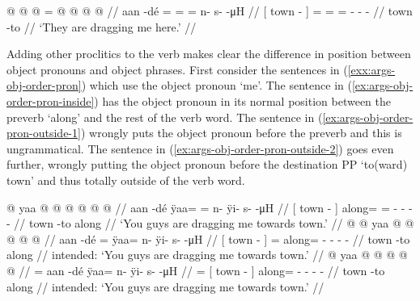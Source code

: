\ex\label{ex:args-obj-preceding}%
\begingl
	\gla	{}  @ {} {}  @  @ = @  @ {} @ {} @ {} //
	\glb	{} aan -dé {} = = = n- s-  -μH //
	\glc	{}[ town - {}] = = = - -
			 -  //
	\gld	{} town -to {}     {} {} {} //
	\glft	‘They are dragging me here.’
		//
\endgl
\xe

Adding other proclitics to the verb makes clear the difference in position between object pronouns and object phrases. First consider the sentences in (\ref{exx:args-obj-order-pron}) which use the object pronoun  ‘me’. The sentence in (\ref{ex:args-obj-order-pron-inside}) has the object pronoun in its normal position between the preverb  ‘along’ and the rest of the verb word. The sentence in (\ref{ex:args-obj-order-pron-outside-1}) wrongly puts the object pronoun before the preverb and this is ungrammatical. The sentence in (\ref{ex:args-obj-order-pron-outside-2}) goes even further, wrongly putting the object pronoun before the destination PP  ‘to(ward) town’ and thus totally outside of the verb word.

\pex\label{exx:args-obj-order-pron}%
\a\label{ex:args-obj-order-pron-inside}%
%
\begingl
	\gla	{}  @ {} {} yaa @  @  @ {} @ {} @ {} @ {} //
	\glb	{} aan -dé {} ÿaa= = n- ÿi- s-  -μH //
	\glc	{}[ town - {}] along= = - - - 
			 - //
	\gld	{} town -to {} along   {} {} {} {} {} //
	\glft	‘You guys are dragging me towards town.’
		//
\endgl
\a\label{ex:args-obj-order-pron-outside-1}%
\ljudge{*}%
%
\begingl
	\gla	{}  @ {} {}  @ yaa @  @ {} @ {} @ {} @ {} //
	\glb	{} aan -dé {} = ÿaa= n- ÿi- s-  -μH //
	\glc	{}[ town - {}] = along= - - - 
			 - //
	\gld	{} town -to {}  along  {} {} {} {} {} //
	\glft	intended: ‘You guys are dragging me towards town.’
		//
\endgl
\a\label{ex:args-obj-order-pron-outside-2}%
\ljudge{*}%
%
\begingl
	\gla	{} {}  @ {} {} yaa @  @ {} @ {} @ {} @ {} //
	\glb	{}= {} aan -dé {} ÿaa= n- ÿi- s-  -μH //
	\glc	{}= {}[ town - {}] along= - - - 
			 - //
	\gld	{} {} town -to{} along  {} {} {} {} {} //
	\glft	intended: ‘You guys are dragging me towards town.’
		//
\endgl
\xe

